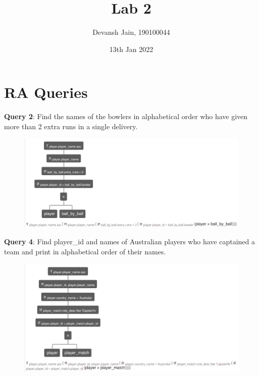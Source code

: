 \documentclass[12pt, fleqn]{article}
\title{Lab 2}
\author{Devansh Jain, 190100044}
\date{13th Jan 2022}
\begin{document}
\maketitle

\section*{RA Queries}
\textbf{Query 2}: Find the names of the bowlers in alphabetical order who have given more than 2 extra runs in a single delivery. \\
\begin{figure}[H]
  \centering
  \includegraphics[scale=0.4]{ra/ra02.png}
\end{figure}

\newpage
\textbf{Query 4}: Find player\_id and names of Australian players who have captained a team and print in alphabetical order of their names. \\
\begin{figure}[H]
  \centering
  \includegraphics[scale=0.4]{ra/ra04.png}
\end{figure}
\end{document}
